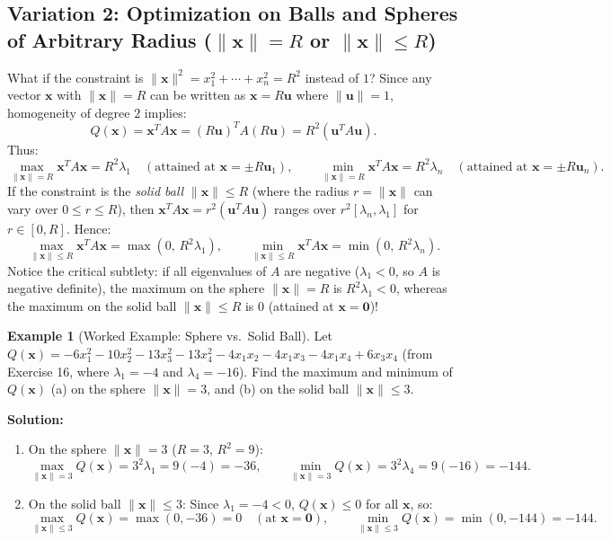 \documentclass[11pt, letterpaper]{article}
\theoremstyle{definition}
\newtheorem{example}{Example}[section]
\theoremstyle{remark}
\begin{document}
\subsection{Variation 2: Optimization on Balls and Spheres of Arbitrary Radius ($\|\mathbf{x}\| = R$ or $\|\mathbf{x}\| \le R$)}
What if the constraint is $\|\mathbf{x}\|^2 = x_1^2 + \cdots + x_n^2 = R^2$ instead of $1$?
Since any vector $\mathbf{x}$ with $\|\mathbf{x}\| = R$ can be written as $\mathbf{x} = R\mathbf{u}$ where $\|\mathbf{u}\| = 1$, homogeneity of degree $2$ implies:
\[
Q(\mathbf{x}) = \mathbf{x}^T A \mathbf{x} = (R\mathbf{u})^T A (R\mathbf{u}) = R^2 (\mathbf{u}^T A \mathbf{u}).
\]
Thus:
\[
\max_{\|\mathbf{x}\| = R} \mathbf{x}^T A \mathbf{x} = R^2 \lambda_1 \quad (\text{attained at } \mathbf{x} = \pm R\mathbf{u}_1), \qquad \min_{\|\mathbf{x}\| = R} \mathbf{x}^T A \mathbf{x} = R^2 \lambda_n \quad (\text{attained at } \mathbf{x} = \pm R\mathbf{u}_n).
\]
If the constraint is the \emph{solid ball} $\|\mathbf{x}\| \le R$ (where the radius $r = \|\mathbf{x}\|$ can vary over $0 \le r \le R$), then $\mathbf{x}^T A \mathbf{x} = r^2 (\mathbf{u}^T A \mathbf{u})$ ranges over $r^2 [\lambda_n, \lambda_1]$ for $r \in [0, R]$. Hence:
\[
\max_{\|\mathbf{x}\| \le R} \mathbf{x}^T A \mathbf{x} = \max(0,\, R^2 \lambda_1), \qquad \min_{\|\mathbf{x}\| \le R} \mathbf{x}^T A \mathbf{x} = \min(0,\, R^2 \lambda_n).
\]
Notice the critical subtlety: if all eigenvalues of $A$ are negative ($\lambda_1 < 0$, so $A$ is negative definite), the maximum on the sphere $\|\mathbf{x}\| = R$ is $R^2 \lambda_1 < 0$, whereas the maximum on the solid ball $\|\mathbf{x}\| \le R$ is $0$ (attained at $\mathbf{x} = \mathbf{0}$)!

\begin{example}[Worked Example: Sphere vs.\ Solid Ball]
Let $Q(\mathbf{x}) = -6x_1^2 - 10x_2^2 - 13x_3^2 - 13x_4^2 - 4x_1x_2 - 4x_1x_3 - 4x_1x_4 + 6x_3x_4$ (from Exercise 16, where $\lambda_1 = -4$ and $\lambda_4 = -16$). Find the maximum and minimum of $Q(\mathbf{x})$ (a) on the sphere $\|\mathbf{x}\| = 3$, and (b) on the solid ball $\|\mathbf{x}\| \le 3$.
\end{example}
\textbf{Solution:}
\begin{enumerate}[label=(\alph*)]
    \item On the sphere $\|\mathbf{x}\| = 3$ ($R = 3$, $R^2 = 9$):
    \[
    \max_{\|\mathbf{x}\|=3} Q(\mathbf{x}) = 3^2 \lambda_1 = 9(-4) = -36, \qquad \min_{\|\mathbf{x}\|=3} Q(\mathbf{x}) = 3^2 \lambda_4 = 9(-16) = -144.
    \]
    \item On the solid ball $\|\mathbf{x}\| \le 3$: Since $\lambda_1 = -4 < 0$, $Q(\mathbf{x}) \le 0$ for all $\mathbf{x}$, so:
    \[
    \max_{\|\mathbf{x}\| \le 3} Q(\mathbf{x}) = \max(0, -36) = 0 \quad (\text{at } \mathbf{x} = \mathbf{0}), \qquad \min_{\|\mathbf{x}\| \le 3} Q(\mathbf{x}) = \min(0, -144) = -144.
    \]
\end{enumerate}
\end{document}
